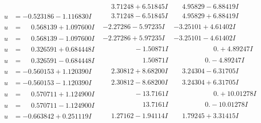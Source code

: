 \documentclass[1p]{elsarticle_modified}
\theoremstyle{definition}
\begin{document}
$$\begin{array}{c|c|c}
 & \phantom{-}3.71248 + 6.51845 I & \phantom{-}4.95829 - 6.88419 I \\ \hline\begin{aligned}
u &= -0.523186 - 1.116830 I\end{aligned}
 & \phantom{-}3.71248 - 6.51845 I & \phantom{-}4.95829 + 6.88419 I \\ \hline\begin{aligned}
u &= \phantom{-}0.568139 + 1.097600 I\end{aligned}
 & -2.27286 - 5.97235 I & -3.25101 + 4.61402 I \\ \hline\begin{aligned}
u &= \phantom{-}0.568139 - 1.097600 I\end{aligned}
 & -2.27286 + 5.97235 I & -3.25101 - 4.61402 I \\ \hline\begin{aligned}
u &= \phantom{-}0.326591 + 0.684448 I\end{aligned}
 & \phantom{-0.000000 } -1.50871 I & \phantom{-0.000000 -}0. + 4.89247 I \\ \hline\begin{aligned}
u &= \phantom{-}0.326591 - 0.684448 I\end{aligned}
 & \phantom{-0.000000 -}1.50871 I & \phantom{-0.000000 } 0. - 4.89247 I \\ \hline\begin{aligned}
u &= -0.560153 + 1.120390 I\end{aligned}
 & \phantom{-}2.30812 + 8.68200 I & \phantom{-}3.24304 - 6.31705 I \\ \hline\begin{aligned}
u &= -0.560153 - 1.120390 I\end{aligned}
 & \phantom{-}2.30812 - 8.68200 I & \phantom{-}3.24304 + 6.31705 I \\ \hline\begin{aligned}
u &= \phantom{-}0.570711 + 1.124900 I\end{aligned}
 & \phantom{-0.000000 } -13.7161 I & \phantom{-0.000000 -}0. + 10.01278 I \\ \hline\begin{aligned}
u &= \phantom{-}0.570711 - 1.124900 I\end{aligned}
 & \phantom{-0.000000 -}13.7161 I & \phantom{-0.000000 } 0. - 10.01278 I \\ \hline\begin{aligned}
u &= -0.663842 + 0.251119 I\end{aligned}
 & \phantom{-}1.27162 - 1.94114 I & \phantom{-}1.79245 + 3.31415 I \\ \hline\begin{aligned}

\end{aligned}
\end{array}$$
\end{document}
